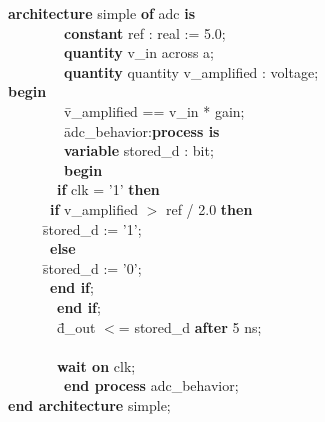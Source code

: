 {\small
\begin{tabbing}
\ \ \ \= \textbf{architecture} simple \textbf{of} adc \textbf{is} \\
\> \ \ \ \ \ \ \ \ \ \ \ \= \textbf{constant} ref : real := 5.0; \\
\> \ \ \ \ \ \ \ \ \ \ \ \= \textbf{quantity} v\_in across a; \\
\> \ \ \ \ \ \ \ \ \ \ \ \= \textbf{quantity} quantity v\_amplified : voltage; \\
\ \ \ \= \textbf{begin} \\
\> \ \ \ \ \ \ \ \ \ \ \ \= v\_amplified == v\_in * gain; \\
\> \ \ \ \ \ \ \ \ \ \ \ \= adc\_behavior:\textbf{process is} \\
\> \ \ \ \ \ \ \ \ \ \ \ \= \textbf{variable} stored\_d : bit; \\
\> \ \ \ \ \ \ \ \ \ \ \ \= \textbf{begin} \\
\> \> \ \ \ \ \ \ \ \ \ \ \= \textbf{if} clk = '1' \textbf{then} \\
\> \> \> \ \ \ \ \ \ \ \ \ \= \textbf{if} v\_amplified $>$ ref / 2.0 \textbf{then} \\
\> \> \> \> \ \ \ \ \ \ \ \ \= stored\_d := '1'; \\
\> \> \> \ \ \ \ \ \ \ \ \ \= \textbf{else} \\
\> \> \> \> \ \ \ \ \ \ \ \ \= stored\_d := '0'; \\
\> \> \> \ \ \ \ \ \ \ \ \ \= \textbf{end if}; \\
\> \> \ \ \ \ \ \ \ \ \ \ \=\textbf{end if};\\
\> \> \ \ \ \ \ \ \ \ \ \ \= d\_out $<$= stored\_d \textbf{after} 5 ns;\\ \\
\> \> \ \ \ \ \ \ \ \ \ \ \= \textbf{wait on} clk;\\
\> \ \ \ \ \ \ \ \ \ \ \ \= \textbf{end process} adc\_behavior;\\
\ \ \ \= \textbf{end architecture} simple;
\end{tabbing}
}





